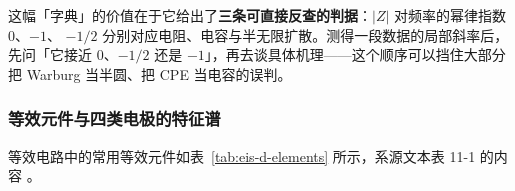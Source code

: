 这幅「字典」的价值在于它给出了\textbf{三条可直接反查的判据}：$|Z|$ 对频率的幂律指数 $0$、$-1$、
$-1/2$ 分别对应电阻、电容与半无限扩散。测得一段数据的局部斜率后，先问「它接近 $0$、$-1/2$ 还是
$-1$」，再去谈具体机理——这个顺序可以挡住大部分把 Warburg 当半圆、把 CPE 当电容的误判。


\subsubsection{等效元件与四类电极的特征谱}

等效电路中的常用等效元件如表~\ref{tab:eis-d-elements} 所示，系源文本表 11-1 的内容
。


